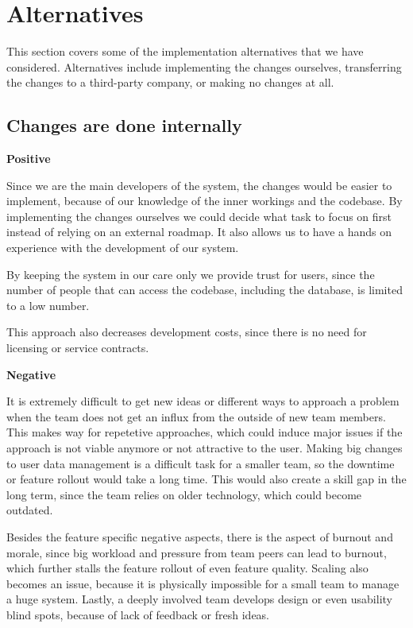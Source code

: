 \documentclass[11pt,a4paper]{article}
\newcommand{\heading}[1]{\vspace{1em}\noindent\textbf{#1}\par\vspace{0.5em}}
\begin{document}
\section{Alternatives}
This section covers some of the implementation alternatives that we have considered. Alternatives include implementing the changes ourselves, transferring the changes to a third-party company, or making no changes at all.


\subsection{Changes are done internally}
\heading{Positive}
Since we are the main developers of the system, the changes would be easier to implement, because of our knowledge of the inner workings and the codebase. By implementing the changes ourselves we could decide what task to focus on first instead of relying on an external roadmap. It also allows us to have a hands on experience with the development of our system.

By keeping the system in our care only we provide trust for users, since the number of people that can access the codebase, including the database, is limited to a low number.

This approach also decreases development costs, since there is no need for licensing or service contracts.

\heading{Negative}
It is extremely difficult to get new ideas or different ways to approach a problem when the team does not get an influx from the outside of new team members. This makes way for repetetive approaches, which could induce major issues if the approach is not viable anymore or not attractive to the user.
Making big changes to user data management is a difficult task for a smaller team, so the downtime or feature rollout would take a long time. This would also create a skill gap in the long term, since the team relies on older technology, which could become outdated.

Besides the feature specific negative aspects, there is the aspect of burnout and morale, since big workload and pressure from team peers can lead to burnout, which further stalls the feature rollout of even feature quality. Scaling also becomes an issue, because it is physically impossible for a small team to manage a huge system. Lastly, a deeply involved team develops design or even usability blind spots, because of lack of feedback or fresh ideas.
\newpage
\end{document}
